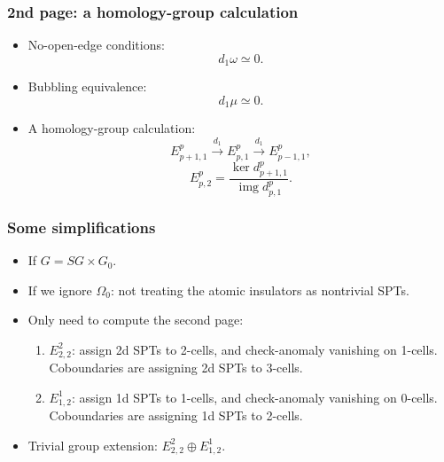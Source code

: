 \documentclass[xcolor=table, 10pt, aspectratio=43]{beamer}
\newcommand{\uone}{\mathrm U(1)}
\DeclareMathOperator{\img}{img}
\begin{document}
\begin{frame}
\frametitle{2nd page: a homology-group calculation}
\begin{itemize}
\item No-open-edge conditions:
\[d_1\omega\simeq 0.\]
\item Bubbling equivalence:
\[d_1\mu\simeq 0.\]
\item A homology-group calculation:
\[E^p_{p+1,1}\xrightarrow{d_1}E^p_{p,1}\xrightarrow{d_1}E^p_{p-1,1},\]
\[E^p_{p,2}=\frac{\ker d^p_{p+1,1}}{\img d^p_{p,1}}.\]
\end{itemize}
\end{frame}





\begin{frame}
\frametitle{Some simplifications}
\begin{itemize}
\item If $G = SG\times G_0$.
\item If we ignore $\Omega_0$: not treating the atomic insulators as nontrivial SPTs.
\item Only need to compute the second page:
\begin{enumerate}
\item $E^2_{2,2}$: assign 2d SPTs to 2-cells, and check-anomaly vanishing on 1-cells. Coboundaries are assigning 2d SPTs to 3-cells.
\item $E^1_{1,2}$: assign 1d SPTs to 1-cells, and check-anomaly vanishing on 0-cells. Coboundaries are assigning 1d SPTs to 2-cells.
\end{enumerate}
\item Trivial group extension: $E^2_{2,2}\oplus E^1_{1,2}$.
\end{itemize}
\end{frame}
\end{document}
